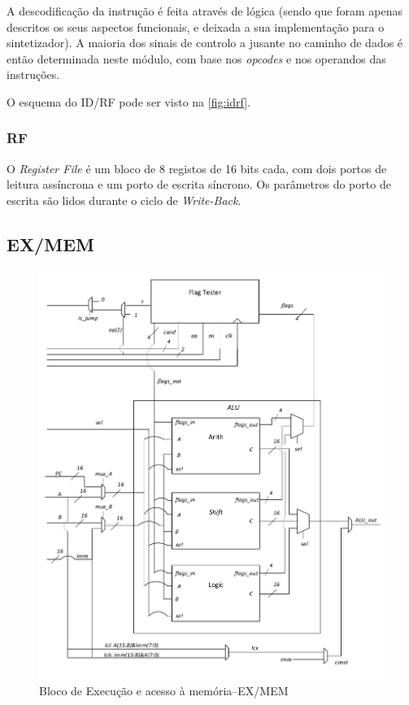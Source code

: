 \documentclass[a4paper]{article}
\begin{document}
			A descodificação da instrução é feita através de lógica (sendo que foram apenas descritos os seus aspectos funcionais, e deixada a sua implementação para o sintetizador). A maioria dos sinais de controlo a jusante no caminho de dados é então determinada neste módulo, com base nos \textit{opcodes} e nos operandos das instruções.

			O esquema do ID/RF pode ser visto na \autoref{fig:idrf}.
			
			\subsubsection{RF}
			
			O \textit{Register File} é um bloco de 8 registos de 16 bits cada, com dois portos de leitura assíncrona e um porto de escrita síncrono. Os parâmetros do porto de escrita são lidos durante o ciclo de \textit{Write-Back}.
			
		\subsection{EX/MEM}
		
			\begin{figure}[H]
				\centering
				\centerline{
					\includegraphics[width=.8\paperwidth]{img/EX}
				}
				\caption{Bloco de Execução e acesso à memória--EX/MEM}
				\label{fig:ex}
			\end{figure}
		
\end{document}

